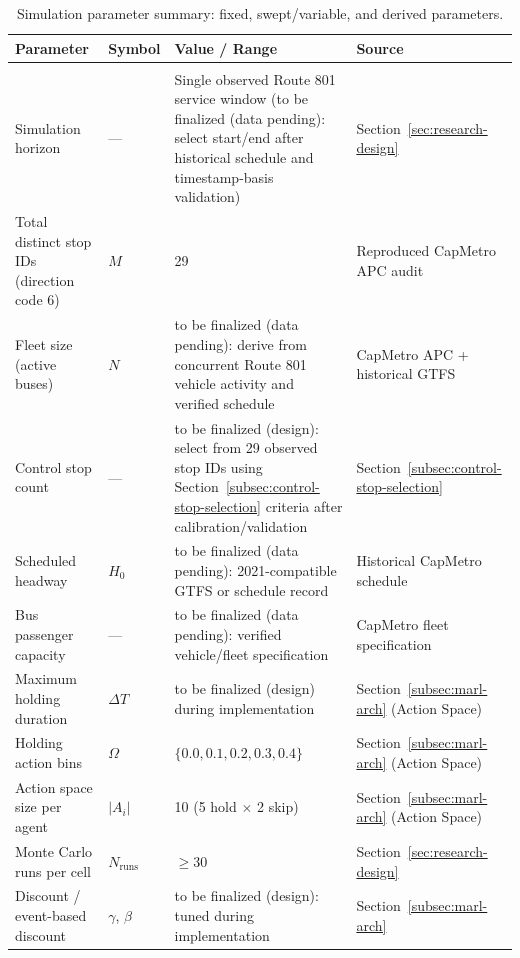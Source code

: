 \begin{table}[htbp]
\centering
\caption{Simulation parameter summary: fixed, swept/variable, and derived parameters.}
\label{tab:sim-parameters}
\small
\renewcommand{\arraystretch}{1.25}

\begin{tabularx}{\textwidth}{
>{\RaggedRight\arraybackslash}p{}
>{\RaggedRight\arraybackslash}p{}
X
>{\RaggedRight\arraybackslash}p{}
}

\toprule
\textbf{Parameter} & \textbf{Symbol} & \textbf{Value / Range} & \textbf{Source} \\
\midrule
\multicolumn{4}{l}{\textit{Fixed simulation parameters}} \\
\midrule

Simulation horizon & --- & Single observed Route 801 service window (to be finalized (data pending): select start/end after historical schedule and timestamp-basis validation) & Section~\ref{sec:research-design} \\
Total distinct stop IDs (direction code 6) & $M$ & 29 & Reproduced CapMetro APC audit \\
Fleet size (active buses) & $N$ & to be finalized (data pending): derive from concurrent Route 801 vehicle activity and verified schedule & CapMetro APC + historical GTFS \\
Control stop count & --- & to be finalized (design): select from 29 observed stop IDs using Section~\ref{subsec:control-stop-selection} criteria after calibration/validation & Section~\ref{subsec:control-stop-selection} \\
Scheduled headway & $H_0$ & to be finalized (data pending): 2021-compatible GTFS or schedule record & Historical CapMetro schedule \\
Bus passenger capacity & --- & to be finalized (data pending): verified vehicle/fleet specification & CapMetro fleet specification \\
Maximum holding duration & $\Delta T$ & to be finalized (design) during implementation & Section~\ref{subsec:marl-arch} (Action Space) \\
Holding action bins & $\Omega$ & $\{0.0, 0.1, 0.2, 0.3, 0.4\}$ & Section~\ref{subsec:marl-arch} (Action Space) \\
Action space size per agent & $|A_i|$ & 10 (5 hold $\times$ 2 skip) & Section~\ref{subsec:marl-arch} (Action Space) \\
Monte Carlo runs per cell & $N_{\text{runs}}$ & $\geq 30$ & Section~\ref{sec:research-design} \\
Discount / event-based discount & $\gamma$, $\beta$ & to be finalized (design): tuned during implementation & Section~\ref{subsec:marl-arch} \\


\end{tabularx}
\end{table}
